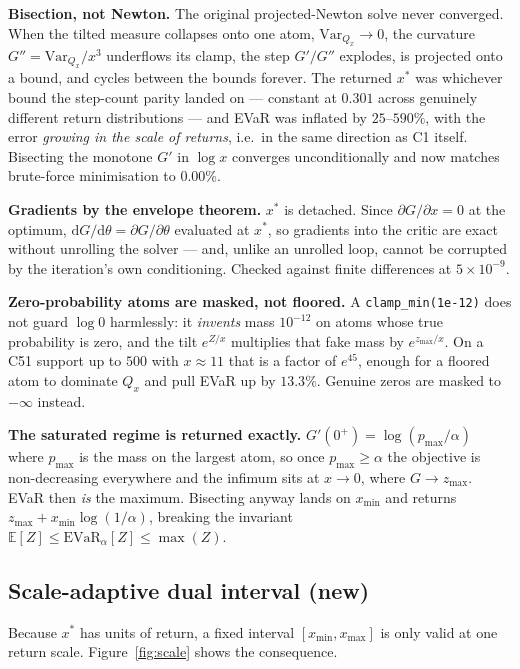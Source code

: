 \documentclass[11pt,a4paper]{article}
\newcommand{\evar}{\mathrm{EVaR}}
\begin{document}
\textbf{Bisection, not Newton.} The original projected-Newton solve never
converged. When the tilted measure collapses onto one atom, $\mathrm{Var}_{Q_x}
\to 0$, the curvature $G'' = \mathrm{Var}_{Q_x}/x^3$ underflows its clamp, the step
$G'/G''$ explodes, is projected onto a bound, and cycles between the bounds
forever. The returned $x^\ast$ was whichever bound the step-count parity landed on
--- constant at $0.301$ across genuinely different return distributions --- and EVaR
was inflated by $25$--$590\%$, with the error \emph{growing in the scale of
returns}, i.e.\ in the same direction as C1 itself. Bisecting the monotone $G'$ in
$\log x$ converges unconditionally and now matches brute-force minimisation to
$0.00\%$.

\textbf{Gradients by the envelope theorem.} $x^\ast$ is detached. Since
$\partial G/\partial x = 0$ at the optimum, $\mathrm{d}G/\mathrm{d}\theta =
\partial G/\partial\theta$ evaluated at $x^\ast$, so gradients into the critic are
exact without unrolling the solver --- and, unlike an unrolled loop, cannot be
corrupted by the iteration's own conditioning. Checked against finite differences at
$5\times 10^{-9}$.

\textbf{Zero-probability atoms are masked, not floored.} A \texttt{clamp\_min(1e-12)}
does not guard $\log 0$ harmlessly: it \emph{invents} mass $10^{-12}$ on atoms whose
true probability is zero, and the tilt $e^{Z/x}$ multiplies that fake mass by
$e^{z_{\max}/x}$. On a C51 support up to $500$ with $x \approx 11$ that is a factor
of $e^{45}$, enough for a floored atom to dominate $Q_x$ and pull EVaR up by
$13.3\%$. Genuine zeros are masked to $-\infty$ instead.

\textbf{The saturated regime is returned exactly.} $G'(0^+) = \log(p_{\max}/\alpha)$
where $p_{\max}$ is the mass on the largest atom, so once $p_{\max} \ge \alpha$ the
objective is non-decreasing everywhere and the infimum sits at $x \to 0$, where
$G \to z_{\max}$. EVaR then \emph{is} the maximum. Bisecting anyway lands on
$x_{\min}$ and returns $z_{\max} + x_{\min}\log(1/\alpha)$, breaking the invariant
$\mathbb{E}[Z] \le \evar_\alpha[Z] \le \max(Z)$.

\subsection{Scale-adaptive dual interval (new)}

Because $x^\ast$ has units of return, a fixed interval $[x_{\min}, x_{\max}]$ is
only valid at one return scale. Figure~\ref{fig:scale} shows the consequence.
\end{document}
